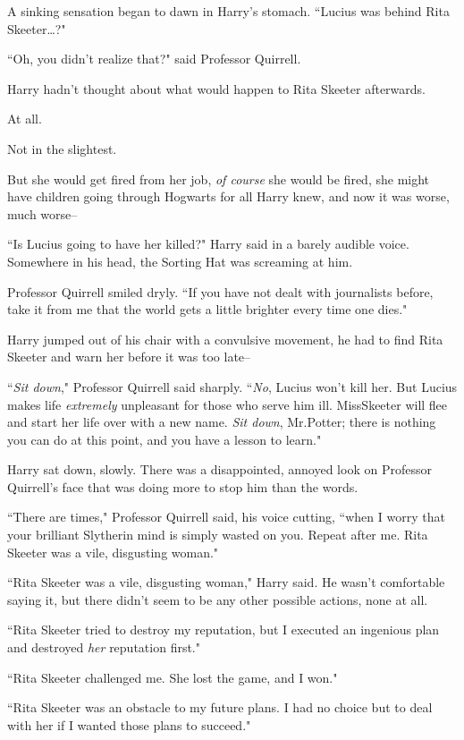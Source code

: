 A sinking sensation began to dawn in Harry's stomach. ``Lucius was behind Rita Skeeter{\ldots}?"

``Oh, you didn't realize that?" said Professor Quirrell.

Harry hadn't thought about what would happen to Rita Skeeter afterwards.

At all.

Not in the slightest.

But she would get fired from her job, \emph{of course} she would be fired, she might have children going through Hogwarts for all Harry knew, and now it was worse, much worse\---

``Is Lucius going to have her killed?" Harry said in a barely audible voice. Somewhere in his head, the Sorting Hat was screaming at him.

Professor Quirrell smiled dryly. ``If you have not dealt with journalists before, take it from me that the world gets a little brighter every time one dies."

Harry jumped out of his chair with a convulsive movement, he had to find Rita Skeeter and warn her before it was too late\---

``\emph{Sit down}," Professor Quirrell said sharply. ``\emph{No}, Lucius won't kill her. But Lucius makes life \emph{extremely} unpleasant for those who serve him ill. Miss\?Skeeter will flee and start her life over with a new name. \emph{Sit down}, Mr.\?Potter; there is nothing you can do at this point, and you have a lesson to learn."

Harry sat down, slowly. There was a disappointed, annoyed look on Professor Quirrell's face that was doing more to stop him than the words.

``There are times," Professor Quirrell said, his voice cutting, ``when I worry that your brilliant Slytherin mind is simply wasted on you. Repeat after me. Rita Skeeter was a vile, disgusting woman."

``Rita Skeeter was a vile, disgusting woman," Harry said. He wasn't comfortable saying it, but there didn't seem to be any other possible actions, none at all.

``Rita Skeeter tried to destroy my reputation, but I executed an ingenious plan and destroyed \emph{her} reputation first."

``Rita Skeeter challenged me. She lost the game, and I won."

``Rita Skeeter was an obstacle to my future plans. I had no choice but to deal with her if I wanted those plans to succeed."


